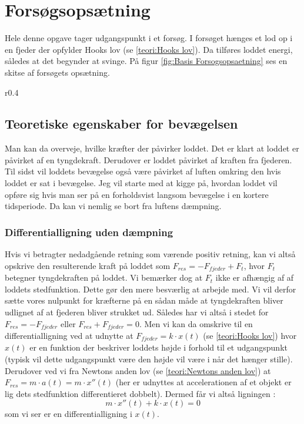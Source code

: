\section{Forsøgsopsætning}\label{teori: opsatning af differentialligninger}
Hele denne opgave tager udgangspunkt i et forsøg.
I forsøget hænges et lod op i en fjeder der opfylder Hooks lov (se \ref{teori:Hooks lov}). 
Da tilføres loddet energi, således at det begynder at svinge. 
På figur \ref{fig:Basis Forsogsopsaetning} ses en skitse af forsøgets opsætning.

\begin{wrapfigure}{r}{0.4\textwidth}
\centering
{}%

\caption{Skitse af forsøgsopsætning.}
\label{fig:Basis Forsogsopsaetning}
\end{wrapfigure} 

\subsection{Teoretiske egenskaber for bevægelsen}
Man kan da overveje, hvilke kræfter der påvirker loddet. 
Det er klart at loddet er påvirket af en tyngdekraft. 
Derudover er loddet påvirket af kraften fra fjederen.
Til sidst vil loddets bevægelse også være påvirket af luften omkring den hvis loddet er sat i bevægelse. 
Jeg vil starte med at kigge på, hvordan loddet vil opføre sig hvis man ser på en forholdsvist langsom bevægelse i en kortere tidsperiode.
Da kan vi nemlig se bort fra luftens dæmpning. 

\subsubsection{Differentialligning uden dæmpning}\label{teori: Opstilling ligning uden dampning}
Hvis vi betragter nedadgående retning som værende positiv retning, kan vi altså opskrive den resulterende kraft på loddet som $F_{res} = -F_{fjeder}+F_{t}$, hvor $F_t$ betegner tyngdekraften på loddet. 
Vi bemærker dog at $F_t$ ikke er afhængig af af loddets stedfunktion. 
Dette gør den mere besværlig at arbejde med. 
Vi vil derfor sætte vores nulpunkt for kræfterne på en sådan måde at tyngdekraften bliver udlignet af at fjederen bliver strukket ud. 
Således har vi altså i stedet for $F_{res}=-F_{fjeder}$ eller $F_{res}+F_{fjeder}=0$.
Men vi kan da omskrive til en differentialligning ved at udnytte at $F_{fjeder}=k \cdot x(t)$ (se \ref{teori:Hooks lov}) hvor $x(t)$ er en funktion der beskriver loddets højde i forhold til et udgangspunkt (typisk vil dette udgangspunkt være den højde vil være i når det hænger stille).  
Derudover ved vi fra Newtons anden lov (se \ref{teori:Newtons anden lov}) at $F_{res}=m\cdot a(t) = m \cdot x''(t)$ 
(her er udnyttes at accelerationen af et objekt er lig dets stedfunktion differentieret dobbelt). 
Dermed får vi altså ligningen :
$$m\cdot x''(t)+k\cdot x(t)=0$$ 
som vi ser er en differentialligning i $x(t)$.

